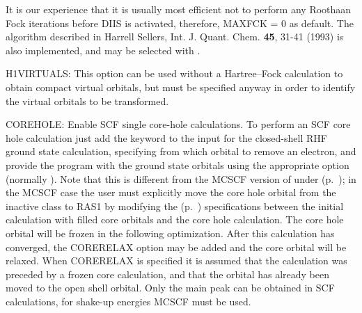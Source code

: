 
It is our experience that
it is usually most efficient not to perform any Roothaan Fock iterations
before DIIS is activated, therefore, MAXFCK = 0 as default.
The algorithm described in
Harrell Sellers, Int. J. Quant. Chem. {\bf 45}, 31-41 (1993) is
also implemented, and may be selected with .


H1VIRTUALS: This option can be used without a Hartree--Fock calculation
to obtain compact virtual orbitals, but  must be
specified anyway in order to identify the virtual orbitals to be transformed.

COREHOLE: Enable SCF
single core-hole calculations. To perform
an SCF core hole calculation just add the 
keyword to the input for the closed-shell RHF ground state
calculation, specifying from which orbital to remove an electron,
and provide the program with the ground state orbitals using the
appropriate  option (normally ).
Note that this is different from the MCSCF version of
 under 
(p.~\pageref{ref-optinp}); in the MCSCF case the user must
explicitly move the core hole orbital from the inactive class to
RAS1 by modifying the 
(p.~\pageref{ref-wavinp}) specifications between the initial
calculation with filled core orbitals and the core hole
calculation. The core hole orbital will be
frozen in the following optimization.
After this calculation has converged, the CORERELAX option may be
added and the core orbital will be relaxed.  
When CORERELAX is specified it is assumed that the
calculation was preceded by a frozen core calculation, and that
the orbital has already been moved to the open shell orbital. Only
the main peak can be obtained in SCF calculations, for shake-up
energies MCSCF must be used.

\pagebreak[3]
\subsection{\label{ref-mp2inp}}

